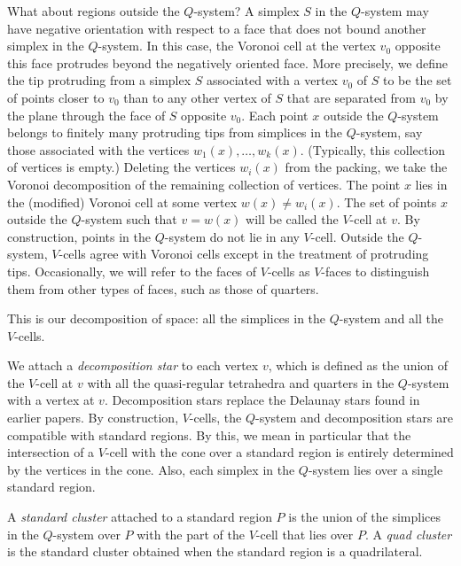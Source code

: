 What about regions outside the $Q$-system?  
A simplex $S$ 
in the $Q$-system may have negative orientation with respect
to a face that does not bound another simplex in the $Q$-system.
In this case, the Voronoi cell at the vertex $v_0$ opposite 
this face protrudes
beyond the negatively oriented face.  
More precisely, we define the tip protruding from a simplex
$S$ associated with a vertex $v_0$ of $S$ to be
the set of points closer to $v_0$ than to any other vertex of $S$
that are
separated from $v_0$ by the plane through the face of $S$ opposite
$v_0$.
Each point $x$ 
outside the $Q$-system belongs
to finitely  many protruding tips from simplices in the $Q$-system,
say those
associated with the vertices $w_1(x),\ldots, w_k(x)$.  
(Typically, this collection
of vertices is empty.)  Deleting the
vertices $w_i(x)$ from the packing, we take the Voronoi decomposition of the
remaining collection of vertices. 
The point $x$ lies in the (modified) Voronoi cell at some vertex
$w(x)\ne w_i(x)$.  
The set of points $x$ outside the $Q$-system such that
$v=w(x)$ will 
be called the $V$-cell at $v$.  By construction, points in the
$Q$-system do not lie in any $V$-cell. Outside the $Q$-system,
$V$-cells agree with Voronoi cells except in the treatment of
protruding tips.  Occasionally, we will refer to the faces of $V$-cells
as $V$-faces to distinguish them from other types of faces,
such as those of quarters.

This is our decomposition of space: all the simplices in the $Q$-system and
all the $V$-cells.  

\endhead

We attach a {\it decomposition star\/} to each vertex $v$, 
which is defined as the 
union of the $V$-cell at $v$ with all the quasi-regular tetrahedra and
 quarters in the $Q$-system with a vertex at $v$.
Decomposition stars replace the Delaunay
stars found in earlier papers.
By construction, $V$-cells, the $Q$-system and decomposition stars
are compatible with 
standard regions.  By this, we mean in particular that the intersection
of a $V$-cell with the cone over a standard region is entirely determined
by the vertices in the cone.  Also, each simplex in the $Q$-system
lies over a single standard region.

A {\it standard cluster\/} attached to a standard region $P$ is the
union of the simplices in the $Q$-system over $P$ with the part of the
$V$-cell that lies over $P$.  A {\it quad cluster\/} 
is the standard cluster
obtained when the standard region is a quadrilateral.

